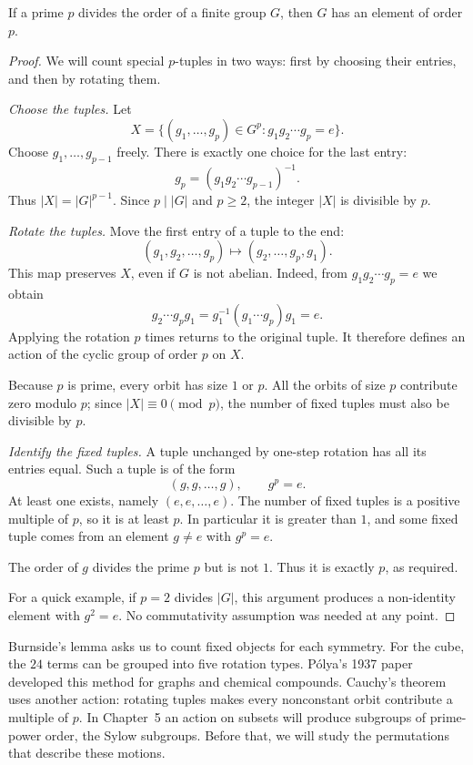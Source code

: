 \begin{theorem}[Cauchy]\label{thm:cauchy}
If a prime $p$ divides the order of a finite group $G$, then $G$ has an element of order $p$.
\end{theorem}
\begin{proof}
We will count special $p$-tuples in two ways: first by choosing their entries, and then by rotating them.

\emph{Choose the tuples.} Let
\[
X=\{(g_1,\ldots,g_p)\in G^p:g_1g_2\cdots g_p=e\}.
\]
Choose $g_1,\ldots,g_{p-1}$ freely. There is exactly one choice for the last entry:
\[
g_p=(g_1g_2\cdots g_{p-1})^{-1}.
\]
Thus $|X|=|G|^{p-1}$. Since $p\mid|G|$ and $p\ge2$, the integer $|X|$ is divisible by $p$.

\emph{Rotate the tuples.} Move the first entry of a tuple to the end:
\[
(g_1,g_2,\ldots,g_p)\longmapsto(g_2,\ldots,g_p,g_1).
\]
This map preserves $X$, even if $G$ is not abelian. Indeed, from $g_1g_2\cdots g_p=e$ we obtain
\[
g_2\cdots g_pg_1=g_1^{-1}(g_1\cdots g_p)g_1=e.
\]
Applying the rotation $p$ times returns to the original tuple. It therefore defines an action of the cyclic group of order $p$ on $X$.

Because $p$ is prime, every orbit has size $1$ or $p$. All the orbits of size $p$ contribute zero modulo $p$; since $|X|\equiv0\pmod p$, the number of fixed tuples must also be divisible by $p$.

\emph{Identify the fixed tuples.} A tuple unchanged by one-step rotation has all its entries equal. Such a tuple is of the form
\[
(g,g,\ldots,g),\qquad g^p=e.
\]
At least one exists, namely $(e,e,\ldots,e)$. The number of fixed tuples is a positive multiple of $p$, so it is at least $p$. In particular it is greater than $1$, and some fixed tuple comes from an element $g\ne e$ with $g^p=e$.

The order of $g$ divides the prime $p$ but is not $1$. Thus it is exactly $p$, as required.

For a quick example, if $p=2$ divides $|G|$, this argument produces a non-identity element with $g^2=e$. No commutativity assumption was needed at any point.
\end{proof}

\begin{beauty}
Burnside's lemma asks us to count fixed objects for each symmetry. For the cube, the $24$ terms can be grouped into five rotation types. P\'olya's 1937 paper developed this method for graphs and chemical compounds. Cauchy's theorem uses another action: rotating tuples makes every nonconstant orbit contribute a multiple of $p$. In Chapter~5 an action on subsets will produce subgroups of prime-power order, the Sylow subgroups. Before that, we will study the permutations that describe these motions.
\end{beauty}

